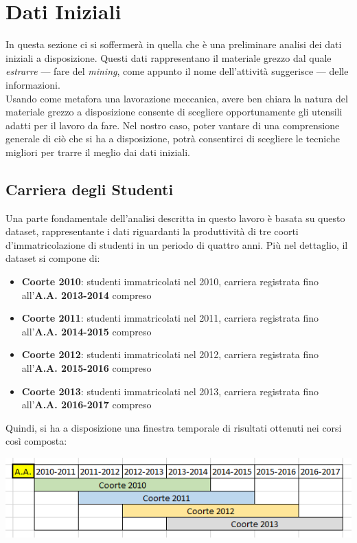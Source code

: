 \chapter{Dati Iniziali}

In questa sezione ci si soffermerà in quella che è una preliminare analisi dei dati iniziali a disposizione. Questi dati rappresentano il materiale grezzo dal quale \textit{estrarre} --- fare del \textit{mining}, come appunto il nome dell'attività suggerisce --- delle informazioni. \\

Usando come metafora una lavorazione meccanica, avere ben chiara la natura del materiale grezzo a disposizione consente di scegliere opportunamente gli utensili adatti per il lavoro da fare. Nel nostro caso, poter vantare di una comprensione generale di ciò che si ha a disposizione, potrà consentirci di scegliere le tecniche migliori per trarre il meglio dai dati iniziali. \\

\section{Carriera degli Studenti}

Una parte fondamentale dell'analisi descritta in questo lavoro è basata su questo dataset, rappresentante i dati riguardanti la produttività di tre coorti d'immatricolazione di studenti in un periodo di quattro anni. Più nel dettaglio, il dataset si compone di:

\begin{itemize}
	\item \textbf{Coorte 2010}: studenti immatricolati nel 2010, carriera registrata fino all'\textbf{A.A. 2013-2014} compreso
	\item \textbf{Coorte 2011}: studenti immatricolati nel 2011, carriera registrata fino all'\textbf{A.A. 2014-2015} compreso
	\item \textbf{Coorte 2012}: studenti immatricolati nel 2012, carriera registrata fino all'\textbf{A.A. 2015-2016} compreso
	\item \textbf{Coorte 2013}: studenti immatricolati nel 2013, carriera registrata fino all'\textbf{A.A. 2016-2017} compreso
\end{itemize}

Quindi, si ha a disposizione una finestra temporale di risultati ottenuti nei corsi così composta:

\begin{center}
	\includegraphics[scale=0.7]{../raw/stud_comp.png}
\end{center}

